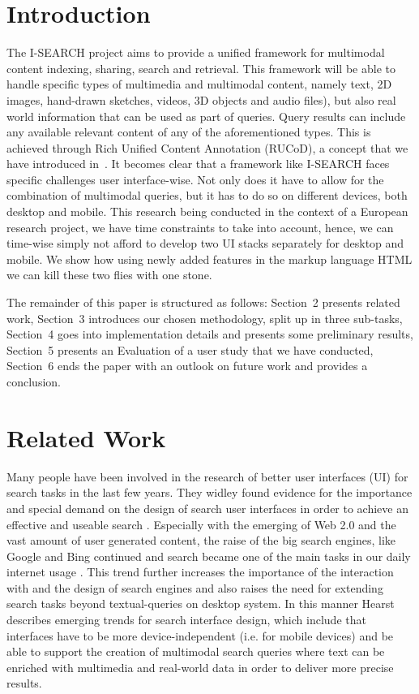 \documentclass[runningheads,a4paper]{llncs} \usepackage[utf8]{inputenc}
\begin{document}
\section{Introduction}
The \mbox{I-SEARCH} project aims to provide a unified framework for multimodal content indexing, sharing, search and retrieval. This framework will be able to handle specific types of multimedia and multimodal content, namely text, 2D images, hand-drawn sketches, videos, 3D objects and audio files), but also real world information that can be used as part of queries. Query results can include any available relevant content of any of the aforementioned types. This is achieved through Rich Unified Content Annotation (RUCoD), a concept that we have introduced in~\cite{ijmis}. It becomes clear that a framework like \mbox{I-SEARCH} faces specific challenges user interface-wise. Not only does it have to allow for the combination of multimodal queries, but it has to do so on different devices, both desktop and mobile. This research being conducted in the context of a European research project, we have time constraints to take into account, hence, we can time-wise simply not afford to develop two UI stacks separately for desktop and mobile. We show how using newly added features in the markup language HTML  we can kill these two flies with one stone.

The remainder of this paper is structured as follows: Section~2 presents related work, Section~3 introduces our chosen methodology, split up in three sub-tasks, Section~4 goes into implementation details and presents some preliminary results, Section~5 presents an Evaluation of a user study that we have conducted, Section~6 ends the paper with an outlook on future work and provides a conclusion.

\section{Related Work}
\label{sec:related}

Many people have been involved in the research of better user
interfaces (UI) for search tasks in the last few years. They widley found
evidence for the importance and special demand on the design of search user
interfaces in order to achieve an effective and useable search \cite{hearst2009}
\cite{quesenbery2008} \cite{huangTsaiChang2009}. Especially with the emerging
of Web 2.0 and the vast amount of user generated content, the raise of the big
search engines, like Google and Bing continued and search became one of the
main tasks in our daily internet usage \cite{quesenbergWeb2008}. This trend
further increases the importance of the interaction with and the design of
search engines and also raises the need for extending search tasks
beyond textual-queries on desktop system. In this manner Hearst
\cite{hearst2011} describes emerging trends for search interface design, which
include that interfaces have to be more device-independent (i.e. for mobile
devices) and be able to support the creation of multimodal search
queries where text can be enriched with multimedia and real-world data in order
to deliver more precise results. 
\end{document}
